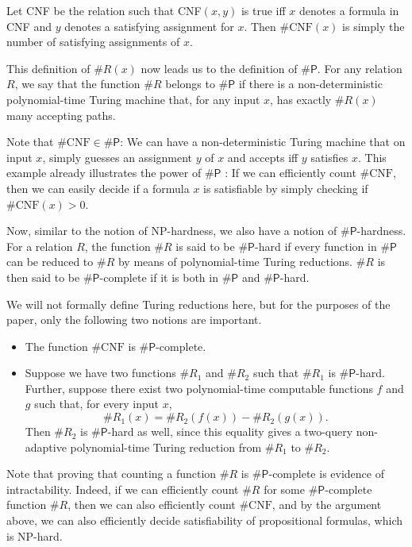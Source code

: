 \documentclass[acmsmall]{acmart}
\newcommand{\sharpP}{\#\mathsf{P}}
\begin{document}
\begin{example}
    Let CNF be the relation such that CNF$(x,y)$ is true iff $x$ denotes a formula in CNF
    and $y$ denotes a satisfying assignment for $x$. Then $\#\text{CNF}(x)$ is simply the number
    of satisfying assignments of $x$.
\end{example}

This definition of $\#R(x)$ now leads us to the definition of $\sharpP$.
For any relation $R$, we say that the function $\#R$ belongs to $\sharpP$ if there is a non-deterministic polynomial-time Turing machine that, for any input $x$, has exactly $\#R(x)$ many accepting paths.

\begin{example}
    Note that $\#\text{CNF} \in \sharpP$: We can have a non-deterministic Turing machine 
    that on input $x$, simply guesses an assignment $y$ of $x$ and accepts iff $y$ satisfies $x$. This example already illustrates the power of $\sharpP$ : If we can efficiently count $\#\text{CNF}$, then we can easily decide if a formula $x$ is satisfiable
    by simply checking if $\#\text{CNF}(x) > 0$. 
\end{example}

Now, similar to the notion of NP-hardness, we also have a notion of $\sharpP$-hardness.
For a relation $R$, the function $\#R$ is said to be $\sharpP$-hard if every 
function in $\sharpP$ can be reduced to $\#R$ by means of polynomial-time Turing reductions. $\#R$ is then said to be $\sharpP$-complete if it is both in $\sharpP$
and $\sharpP$-hard.

We will not formally define Turing reductions here, but for the purposes of the paper, only the following two notions are important. 
\begin{itemize}
    \item The function $\#\text{CNF}$ is $\sharpP$-complete.
\item Suppose we have two functions $\#R_1$ and $\#R_2$ such that
$\#R_1$ is $\sharpP$-hard. Further, suppose there exist two
polynomial-time computable functions $f$ and $g$ such that, for every
input $x$,
\[
    \#R_1(x)=\#R_2(f(x))-\#R_2(g(x)).
\]
Then $\#R_2$ is $\sharpP$-hard as well, since this equality gives a
two-query non-adaptive polynomial-time Turing reduction from $\#R_1$
to $\#R_2$.
\end{itemize}

Note that proving that counting a function $\#R$ is $\sharpP$-complete is evidence of intractability. Indeed, if we can efficiently count $\#R$ for some $\sharpP$-complete
function $\#R$, then we can also efficiently count $\#\text{CNF}$, and by the argument above,
we can also efficiently decide satisfiability of propositional formulas, which is NP-hard.
\end{document}
